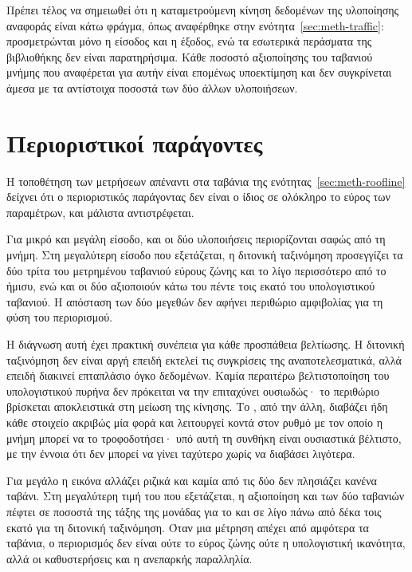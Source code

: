 Πρέπει τέλος να σημειωθεί ότι η καταμετρούμενη κίνηση δεδομένων της υλοποίησης
αναφοράς είναι κάτω φράγμα, όπως αναφέρθηκε στην ενότητα~\ref{sec:meth-traffic}:
προσμετρώνται μόνο η είσοδος και η έξοδος, ενώ τα εσωτερικά περάσματα της
βιβλιοθήκης δεν είναι παρατηρήσιμα. Κάθε ποσοστό αξιοποίησης του ταβανιού μνήμης
που αναφέρεται για αυτήν είναι επομένως υποεκτίμηση και δεν συγκρίνεται άμεσα με
τα αντίστοιχα ποσοστά των δύο άλλων υλοποιήσεων.

\section{Περιοριστικοί παράγοντες}
\label{sec:cpu-bottlenecks}

Η τοποθέτηση των μετρήσεων απέναντι στα ταβάνια της
ενότητας~\ref{sec:meth-roofline} δείχνει ότι ο περιοριστικός παράγοντας δεν
είναι ο ίδιος σε ολόκληρο το εύρος των παραμέτρων, και μάλιστα αντιστρέφεται.

Για μικρό  και μεγάλη είσοδο, και οι δύο υλοποιήσεις περιορίζονται σαφώς
από τη μνήμη. Στη μεγαλύτερη είσοδο που εξετάζεται, η διτονική ταξινόμηση
προσεγγίζει τα δύο τρίτα του μετρημένου ταβανιού εύρους ζώνης και το
 λίγο περισσότερο από το ήμισυ, ενώ και οι δύο αξιοποιούν κάτω
του πέντε τοις εκατό του υπολογιστικού ταβανιού. Η απόσταση των δύο μεγεθών δεν
αφήνει περιθώριο αμφιβολίας για τη φύση του περιορισμού.

Η διάγνωση αυτή έχει πρακτική συνέπεια για κάθε προσπάθεια βελτίωσης. Η διτονική
ταξινόμηση δεν είναι αργή επειδή εκτελεί τις συγκρίσεις της αναποτελεσματικά,
αλλά επειδή διακινεί επταπλάσιο όγκο δεδομένων. Καμία περαιτέρω βελτιστοποίηση
του υπολογιστικού πυρήνα δεν πρόκειται να την επιταχύνει ουσιωδώς· το περιθώριο
βρίσκεται αποκλειστικά στη μείωση της κίνησης. Το , από την άλλη,
διαβάζει ήδη κάθε στοιχείο ακριβώς μία φορά και λειτουργεί κοντά στον ρυθμό με
τον οποίο η μνήμη μπορεί να το τροφοδοτήσει· υπό αυτή τη συνθήκη είναι ουσιαστικά
βέλτιστο, με την έννοια ότι δεν μπορεί να γίνει ταχύτερο χωρίς να διαβάσει
λιγότερα.

Για μεγάλο  η εικόνα αλλάζει ριζικά και καμία από τις δύο δεν πλησιάζει
κανένα ταβάνι. Στη μεγαλύτερη τιμή του  που εξετάζεται, η αξιοποίηση και
των δύο ταβανιών πέφτει σε ποσοστά της τάξης της μονάδας για το 
και σε λίγο πάνω από δέκα τοις εκατό για τη διτονική ταξινόμηση. Όταν μια
μέτρηση απέχει από αμφότερα τα ταβάνια, ο περιορισμός δεν είναι ούτε το εύρος
ζώνης ούτε η υπολογιστική ικανότητα, αλλά οι καθυστερήσεις και η ανεπαρκής
παραλληλία.


